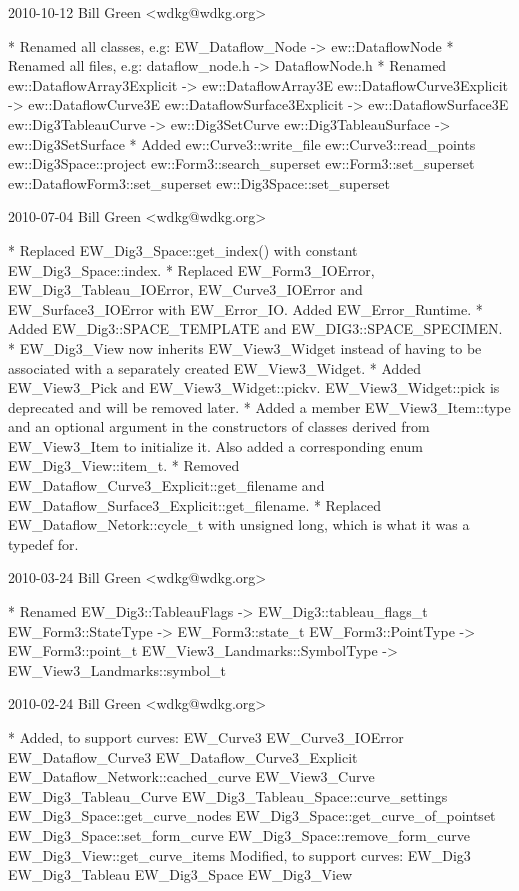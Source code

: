 
\begin{DoxyVerbInclude}
2010-10-12  Bill Green  <wdkg@wdkg.org>

    * Renamed all classes, e.g:
        EW_Dataflow_Node -> ew::DataflowNode
    * Renamed all files, e.g:
        dataflow_node.h -> DataflowNode.h
    * Renamed
        ew::DataflowArray3Explicit -> ew::DataflowArray3E
        ew::DataflowCurve3Explicit -> ew::DataflowCurve3E
        ew::DataflowSurface3Explicit -> ew::DataflowSurface3E
        ew::Dig3TableauCurve -> ew::Dig3SetCurve
        ew::Dig3TableauSurface -> ew::Dig3SetSurface
    * Added
        ew::Curve3::write_file
        ew::Curve3::read_points
        ew::Dig3Space::project
        ew::Form3::search_superset
        ew::Form3::set_superset
        ew::DataflowForm3::set_superset
        ew::Dig3Space::set_superset


2010-07-04  Bill Green  <wdkg@wdkg.org>

    * Replaced EW_Dig3_Space::get_index() with constant EW_Dig3_Space::index.
    * Replaced EW_Form3_IOError, EW_Dig3_Tableau_IOError, EW_Curve3_IOError and
    EW_Surface3_IOError with EW_Error_IO.
    Added EW_Error_Runtime.
    * Added EW_Dig3::SPACE_TEMPLATE and EW_DIG3::SPACE_SPECIMEN.
    * EW_Dig3_View now inherits EW_View3_Widget instead of having to be
    associated with a separately created EW_View3_Widget.
    * Added EW_View3_Pick and EW_View3_Widget::pickv.
    EW_View3_Widget::pick is deprecated and will be removed later.
    * Added a member EW_View3_Item::type and an optional argument in
    the constructors of classes derived from EW_View3_Item to initialize it.
    Also added a corresponding enum EW_Dig3_View::item_t.
    * Removed EW_Dataflow_Curve3_Explicit::get_filename and
    EW_Dataflow_Surface3_Explicit::get_filename.
    * Replaced EW_Dataflow_Netork::cycle_t with unsigned long, which is
    what it was a typedef for.


2010-03-24  Bill Green  <wdkg@wdkg.org>

   * Renamed
       EW_Dig3::TableauFlags -> EW_Dig3::tableau_flags_t
       EW_Form3::StateType -> EW_Form3::state_t
       EW_Form3::PointType -> EW_Form3::point_t
       EW_View3_Landmarks::SymbolType -> EW_View3_Landmarks::symbol_t


2010-02-24  Bill Green  <wdkg@wdkg.org>

   * Added, to support curves:
       EW_Curve3
       EW_Curve3_IOError
       EW_Dataflow_Curve3
       EW_Dataflow_Curve3_Explicit
       EW_Dataflow_Network::cached_curve
       EW_View3_Curve
       EW_Dig3_Tableau_Curve
       EW_Dig3_Tableau_Space::curve_settings
       EW_Dig3_Space::get_curve_nodes
       EW_Dig3_Space::get_curve_of_pointset
       EW_Dig3_Space::set_form_curve
       EW_Dig3_Space::remove_form_curve
       EW_Dig3_View::get_curve_items
    Modified, to support curves:
       EW_Dig3
       EW_Dig3_Tableau
       EW_Dig3_Space
       EW_Dig3_View



\end{DoxyVerbInclude}
